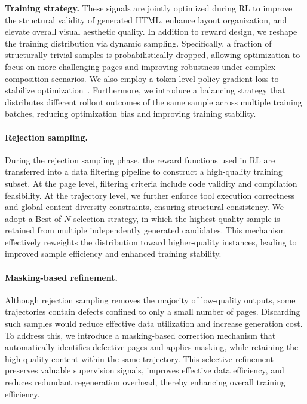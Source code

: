 \textbf{Training strategy.} These signals are jointly optimized during RL to improve the structural validity of generated HTML, enhance layout organization, and elevate overall visual aesthetic quality. In addition to reward design, we reshape the training distribution via dynamic sampling. Specifically, a fraction of structurally trivial samples is probabilistically dropped, allowing optimization to focus on more challenging pages and improving robustness under complex composition scenarios. We also employ a token-level policy gradient loss to stabilize optimization~\cite{yu2025dapo}. Furthermore, we introduce a balancing strategy that distributes different rollout outcomes of the same sample across multiple training batches, reducing optimization bias and improving training stability.


\paragraph{Rejection sampling.}
During the rejection sampling phase, the reward functions used in RL are transferred into a data filtering pipeline to construct a high-quality training subset.
At the page level, filtering criteria include code validity and compilation feasibility. At the trajectory level, we further enforce tool execution correctness and global content diversity constraints, ensuring structural consistency.
We adopt a Best-of-$N$ selection strategy, in which the highest-quality sample is retained from multiple independently generated candidates. This mechanism effectively reweights the distribution toward higher-quality instances, leading to improved sample efficiency and enhanced training stability.

\paragraph{Masking-based refinement.} 
Although rejection sampling removes the majority of low-quality outputs, some trajectories contain defects confined to only a small number of pages. Discarding such samples would reduce effective data utilization and increase generation cost. To address this, we introduce a masking-based correction mechanism that automatically identifies defective pages and applies masking, while retaining the high-quality content within the same trajectory. This selective refinement preserves valuable supervision signals, improves effective data efficiency, and reduces redundant regeneration overhead, thereby enhancing overall training efficiency.

